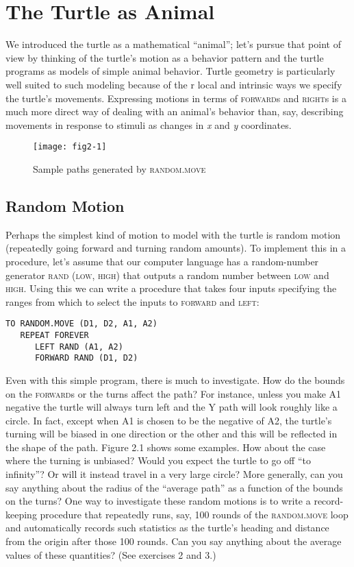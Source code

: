 \documentclass{book}
\begin{document}
\section{The Turtle as Animal}

We introduced the turtle as a mathematical ``animal''; let's pursue that
point of view by thinking of the turtle's motion as a behavior pattern
and the turtle programs as models of simple animal behavior. Turtle
geometry is particularly well suited to such modeling because of the
r local and intrinsic ways we specify the turtle's movements. Expressing
motions in terms of \textsc{forward}s and \textsc{right}s is a much more direct way of
dealing with an animal's behavior than, say, describing movements in
response to stimuli as changes in {\em x} and {\em y} coordinates.

\begin{figure}
\begin{center}
\texttt{[image: fig2-1]}
\caption{Sample paths generated by \textsc{random}\textsc{.move}}
\end{center}
\end{figure}

\subsection{Random Motion}

Perhaps the simplest kind of motion to model with the turtle is random
motion (repeatedly going forward and turning random amounts). To
implement this in a procedure, let's assume that our computer language
has a random-number generator \textsc{rand (low, high)} that outputs a random
number between \textsc{low} and \textsc{high}. Using this we can write a procedure that
takes four inputs specifying the ranges from which to select the inputs
to \textsc{forward} and \textsc{left}:

\begin{verbatim}
TO RANDOM.MOVE (D1, D2, A1, A2)
   REPEAT FOREVER
      LEFT RAND (A1, A2)
      FORWARD RAND (D1, D2)
\end{verbatim}
Even with this simple program, there is much to investigate. How do
the bounds on the \textsc{forward}s or the turns affect the path? For instance,
unless you make A1 negative the turtle will always turn left and the Y
path will look roughly like a circle. In fact, except when A1 is chosen to
be the negative of A2, the turtle's turning will be biased in one direction 
or the other and this will be reflected in the shape of the path. Figure
2.1 shows some examples. How about the case where the turning is 
unbiased? Would you expect the turtle to go off ``to infinity''? Or will 
it instead travel in a very large circle? More generally, can you say
anything about the radius of the ``average path'' as a function of the 
bounds on the turns? One way to investigate these random motions is to
write a record-keeping procedure that repeatedly runs, say, 100 rounds
of the \textsc{random.move} loop and automatically records such statistics as
the turtle's heading and distance from the origin after those 100 rounds.
Can you say anything about the average values of these quantities? (See
exercises 2 and 3.)
\end{document}
